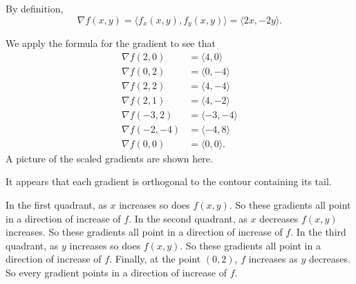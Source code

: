 \begin{activitySolution}
\ba 
\item By definition, 
\[\nabla f (x,y) = \langle f_x(x,y), f_y(x,y) \rangle = \langle 2x, -2y \rangle.\]

\item We apply the formula for the gradient to see that 
\begin{align*}
\nabla f(2,0) &= \langle 4,0 \rangle \\
\nabla f(0,2) &= \langle 0,-4 \rangle \\
\nabla f(2,2) &= \langle 4,-4 \rangle \\
\nabla f(2,1) &= \langle 4,-2 \rangle \\
\nabla f(-3,2) &= \langle -3,-4 \rangle \\
\nabla f(-2,-4) &= \langle -4,8 \rangle \\
\nabla f (0,0) &= \langle 0,0 \rangle.
\end{align*}
A picture of the scaled gradients are shown here. 
   \begin{center}
    \end{center}
\item It appears that each gradient is orthogonal to the contour containing its tail.
\item In the first quadrant, as $x$ increases so does $f(x,y)$. So these gradients all point in a direction of increase of $f$. In the second quadrant, as $x$ decreases $f(x,y)$ increases. So these gradients all point in a direction of increase of $f$. In the third quadrant, as $y$ increases so does $f(x,y)$. So these gradients all point in a direction of increase of $f$. Finally, at the point $(0,2)$, $f$ increases as $y$ decreases. So every gradient points in a direction of increase of $f$.
\ea
 
\end{activitySolution}
\aftera

